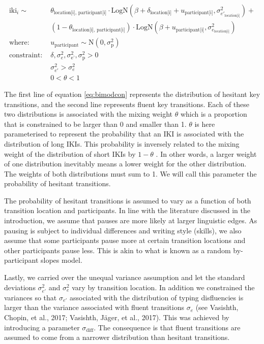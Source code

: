 \documentclass[
  english,
  man,floatsintext]{apa7}
\begin{document}
\begin{appendix}
\begin{equation}
\begin{aligned}
\label{eq:bimodcon}
\text{iki}_{i} \sim\text{ } & \theta_\text{location[i], participant[i]} \cdot \text{LogN}(\beta + \delta_\text{location[i]} + u_\text{participant[i]}, \sigma_{e'_\text{location[i]}}^2) + \\
  & (1 - \theta_\text{location[i], participant[i]}) \cdot \text{LogN}(\beta + u_\text{participant[i]}, \sigma_{e_\text{location[i]}}^2)\\
\text{where: } & u_\text{participant} \sim \text{N}(0, \sigma_\text{p}^2) \\
\text{constraint: } & \delta, \sigma_{e}^2, \sigma_\text{e'}^2, \sigma_\text{p}^2>0\\
        & \sigma_{e'}^2 > \sigma_{e}^2\\
        & 0 < \theta < 1
\end{aligned}
\end{equation}

The first line of equation \ref{eq:bimodcon} represents the distribution
of hesitant key transitions, and the second line represents fluent key
transitions. Each of these two distributions is associated with the
mixing weight \(\theta\) which is a proportion that is constrained to be
larger than 0 and smaller than 1. \(\theta\) is here parameterised to
represent the probability that an IKI is associated with the
distribution of long IKIs. This probability is inversely related to the
mixing weight of the distribution of short IKIs by \(1-\theta\) . In
other words, a larger weight of one distribution inevitably means a
lower weight for the other distribution. The weights of both
distributions must sum to 1. We will call this parameter the probability
of hesitant transitions.

The probability of hesitant transitions is assumed to vary as a function
of both transition location and participants. In line with the
literature discussed in the introduction, we assume that pauses are more
likely at larger linguistic edges. As pausing is subject to individual
differences and writing style (skills), we also assume that some
participants pause more at certain transition locations and other
participants pause less. This is akin to what is known as a random
by-participant slopes model.

Lastly, we carried over the unequal variance assumption and let the
standard deviations \(\sigma_{e'}^2\) and \(\sigma_{e}^2\) vary by
transition location. In addition we constrained the variances so that
\(\sigma_{e'}\) associated with the distribution of typing disfluencies
is larger than the variance associated with fluent transitions
\(\sigma_e\) (see Vasishth, Chopin, et al., 2017; Vasishth, Jäger, et
al., 2017). This was achieved by introducing a parameter
\(\sigma_\text{diff}\). The consequence is that fluent transitions are
assumed to come from a narrower distribution than hesitant transitions.


\end{appendix}
\end{document}
